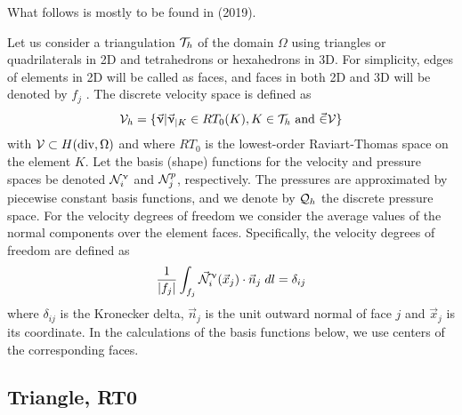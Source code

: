 \newpage
What follows is mostly to be found in \textcite{weso19} (2019).

Let us consider a triangulation ${\cal T}_h$ of the domain $\Omega$ 
using triangles or quadrilaterals in 2D and tetrahedrons or
hexahedrons in 3D. For simplicity, edges of elements in 2D will be called as faces, 
and faces in both 2D and 3D will be denoted by $f_j$ . The discrete velocity space is defined as 
\cite{ergu21_72}
\[
{\cal V}_h = \{ \vec{\upnu} | \vec{\upnu}_{|K}  \in RT_0(K) , K\in {\cal T}_h \text{ and } \vec\in {\cal V} \}
\]
with ${\cal V} \subset H(\text{div},\Omega)$ and
where $RT_0$ is the lowest-order Raviart-Thomas space on the element $K$. 
Let the basis (shape) functions for the velocity and pressure spaces be denoted ${\mathcal{N}}^\upnu_i$ and 
${\mathcal{N}}^p_j$, respectively. The pressures are approximated by piecewise
constant basis functions, and we denote by ${\cal Q}_h$ the discrete pressure space. For the velocity degrees of freedom we
consider the average values of the normal components over the element faces. Specifically, the velocity degrees of
freedom are defined as
\begin{equation}
\frac{1}{|f_j|} \int_{f_j} \vec{{\mathcal{N}}}^\upnu_i( \vec{x}_j) \cdot \vec{n}_j \; dl = \delta_{ij} 
\label{eq:RTbfdef}
\end{equation}
where $\delta_{ij}$ is the Kronecker delta, $\vec{n}_j$ is the unit outward normal of face $j$ 
and $\vec{x}_j$ is its coordinate. In the calculations
of the basis functions below, we use centers of the corresponding faces.

\subsection{Triangle, RT0}

\begin{center}
\end{center}


